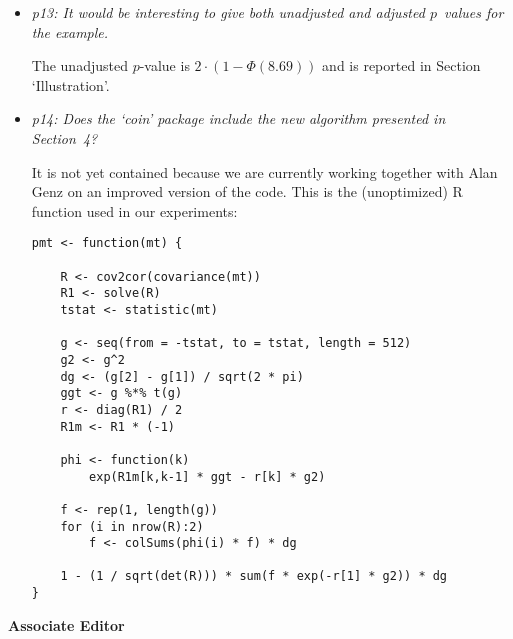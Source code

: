 \documentclass[11pt,a4paper]{article}
\begin{document}
\begin{itemize}
  \item \textit{p13: It would be interesting to give both unadjusted and adjusted $p$~values
        for the example.}
	
	The unadjusted $p$-value is $2 \cdot (1 - \Phi(8.69))$ and is reported in 
        Section `Illustration'.
	
  \item \textit{p14: Does the `coin' package include the new algorithm presented in
        Section~4?}
	
	It is not yet contained because we are currently working together with Alan Genz
	on an improved version of the code. This is the (unoptimized) R function
        used in our experiments:
\begin{verbatim}
pmt <- function(mt) {

    R <- cov2cor(covariance(mt))
    R1 <- solve(R)
    tstat <- statistic(mt)

    g <- seq(from = -tstat, to = tstat, length = 512)
    g2 <- g^2
    dg <- (g[2] - g[1]) / sqrt(2 * pi)
    ggt <- g %*% t(g)
    r <- diag(R1) / 2
    R1m <- R1 * (-1)

    phi <- function(k)
        exp(R1m[k,k-1] * ggt - r[k] * g2)

    f <- rep(1, length(g))
    for (i in nrow(R):2)
        f <- colSums(phi(i) * f) * dg

    1 - (1 / sqrt(det(R))) * sum(f * exp(-r[1] * g2)) * dg
}
\end{verbatim}    


\end{itemize}


\textbf{\large Associate Editor}
\end{document}
